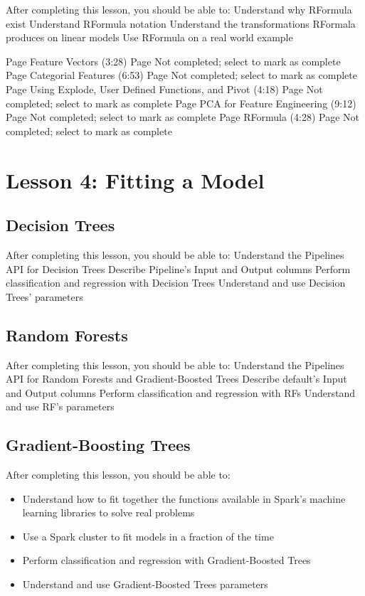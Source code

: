 After completing this lesson, you should be able to:
Understand why RFormula exist
Understand RFormula notation
Understand the transformations RFormala produces on linear models
Use RFormula on a real world example
 

Page Feature Vectors (3:28) Page Not completed; select to mark as complete
Page Categorial Features (6:53) Page Not completed; select to mark as complete
Page Using Explode, User Defined Functions, and Pivot (4:18) Page Not completed; select to mark as complete
Page PCA for Feature Engineering (9:12) Page Not completed; select to mark as complete
Page RFormula (4:28) Page Not completed; select to mark as complete

\newapge
\section{ Lesson 4: Fitting a Model }

 

\subsection{ Decision Trees }

After completing this lesson, you should be able to:
Understand the Pipelines API for Decision Trees
Describe Pipeline’s Input and Output columns
Perform classification and regression with Decision Trees
Understand and use Decision Trees’ parameters
\subsection{ Random Forests }

After completing this lesson, you should be able to:
Understand the Pipelines API for Random Forests and Gradient-Boosted Trees
Describe default’s Input and Output columns
Perform classification and regression with RFs
Understand and use RF’s parameters
\subsection{ Gradient-Boosting Trees }

After completing this lesson, you should be able to:
\begin{itemize}
\item Understand how to fit together the functions available in Spark’s machine learning libraries to solve real problems
\item Use a Spark cluster to fit models in a fraction of the time
\item Perform classification and regression with Gradient-Boosted Trees
\item Understand and use Gradient-Boosted Trees parameters
\end{itemize}
